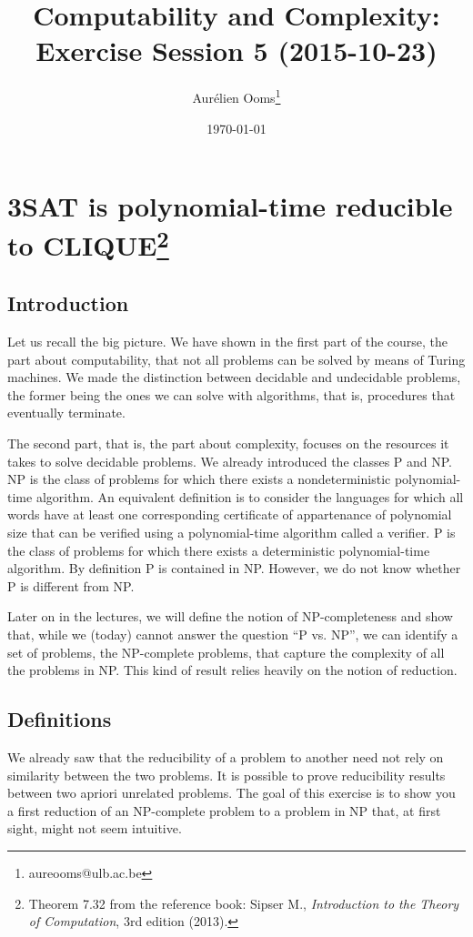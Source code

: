 \documentclass{article}
\title{Computability and Complexity:\\Exercise Session 5 (2015-10-23)}
\author{Aurélien Ooms\footnote{aureooms@ulb.ac.be}}
\date{\today}
\begin{document}
\maketitle
\tableofcontents

\section{3SAT is polynomial-time reducible to CLIQUE\footnote{%
Theorem 7.32 from the reference book: Sipser M.,
\emph{Introduction to the Theory of Computation}, 3rd edition (2013).}}

\subsection{Introduction}

Let us recall the big picture. We have shown in the first part of the course,
the part about computability, that not all problems can be solved by means of
Turing machines. We made the distinction between decidable and undecidable
problems, the former being the ones we can solve with algorithms, that is,
procedures that eventually terminate.

The second part, that is, the part about complexity, focuses on the resources
it takes to solve decidable problems. We already introduced the classes P and
NP. NP is the class of problems for which there exists a nondeterministic
polynomial-time algorithm. An equivalent definition is to consider the
languages for which all words have at least one corresponding certificate of
appartenance of polynomial size that can be verified using a polynomial-time
algorithm called a verifier. P is the class of problems for which there exists
a deterministic polynomial-time algorithm. By definition P is contained in NP.
However, we do not know whether P is different from NP.

Later on in the lectures, we will define the notion of NP-completeness and show
that, while we (today) cannot answer the question ``P vs. NP'', we can identify
a set of problems, the NP-complete problems, that capture the complexity of all
the problems in NP. This kind of result relies heavily on the notion of
reduction.

\subsection{Definitions}

We already saw that the reducibility of a problem to
another need not rely on similarity between the two problems. It is
possible to prove reducibility results between two apriori unrelated problems.
The goal of this exercise is to show you a first reduction of an NP-complete
problem to a problem in NP that, at first sight, might not seem intuitive.
\end{document}
